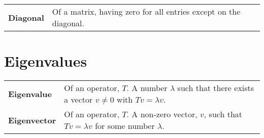 \documentclass[10pt, a4paper, landscape]{article}
\newcommand{\defn}[1]{\textbf{#1}}
\begin{document}
\begin{multicols*}{3}
\begin{tabularx}{\columnwidth}{@{}l>{\raggedright\arraybackslash}X@{}}
  \defn{Diagonal} & Of a matrix, having zero for all entries except on the diagonal.
                                                     
                
\end{tabularx}



\section*{Eigenvalues}
\begin{tabularx}{\columnwidth}{@{}l>{\raggedright\arraybackslash}X@{}}
  \toprule
  \defn{Eigenvalue} &
                      Of an operator, $T$. A number $\lambda$ such that there exists a vector $v\neq 0$ with $Tv=\lambda v$. 
  \\
  \defn{Eigenvector} &
                       Of an operator, $T$. A non-zero vector, $v$, such that $Tv=\lambda v$ for some number $\lambda$.
  \\

\end{tabularx}
\end{multicols*}
\end{document}
